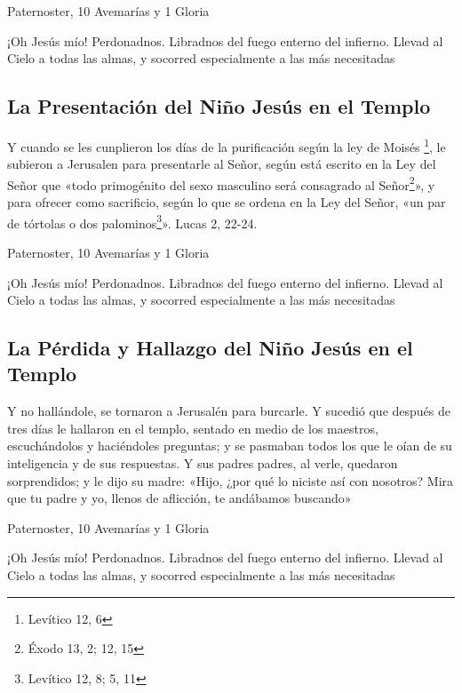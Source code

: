 \documentclass[a4paper,11pt, oneside]{report}
\begin{document}
        \smallskip
         Paternoster, 10 Avemarías y 1 Gloria
        
        \smallskip
        ¡Oh Jesús mío! Perdonadnos. Libradnos del fuego enterno del infierno. Llevad al Cielo a todas las almas, y socorred especialmente a las más 
        necesitadas
    
      \subsection{La Presentación del Niño Jesús en el Templo}
        Y cuando se les cunplieron los días de la purificación según la ley de Moisés \footnote{Levítico 12, 6}, le subieron a Jerusalen para presentarle al Señor, según está escrito
        en la Ley del Señor que «todo primogénito del sexo masculino será consagrado al Señor\footnote{Éxodo 13, 2; 12, 15}», y para ofrecer como sacrificio, según lo que 
        se ordena en la Ley del Señor, «un par de tórtolas o dos palominos\footnote{Levítico 12, 8; 5, 11}». Lucas 2, 22-24\cite{bover-cantera}.
        
        \smallskip
         Paternoster, 10 Avemarías y 1 Gloria
        
        \smallskip
        ¡Oh Jesús mío! Perdonadnos. Libradnos del fuego enterno del infierno. Llevad al Cielo a todas las almas, y socorred especialmente a las más 
        necesitadas
              
      \subsection{La Pérdida y Hallazgo del Niño Jesús en el Templo}
        Y no hallándole, se tornaron a Jerusalén para burcarle. Y sucedió que después de tres días le hallaron en el templo, sentado en medio de los maestros,
        escuchándolos y haciéndoles preguntas; y se pasmaban todos los que le oían de su inteligencia y de sus respuestas. Y sus padres padres, al verle, quedaron
        sorprendidos; y le dijo su madre: «Hijo, ¿por qué lo niciste así con nosotros? Mira que tu padre y yo, llenos de aflicción, te andábamos buscando»
        
        \smallskip
         Paternoster, 10 Avemarías y 1 Gloria
        
        \smallskip
        ¡Oh Jesús mío! Perdonadnos. Libradnos del fuego enterno del infierno. Llevad al Cielo a todas las almas, y socorred especialmente a las más 
        necesitadas
        
\end{document}

